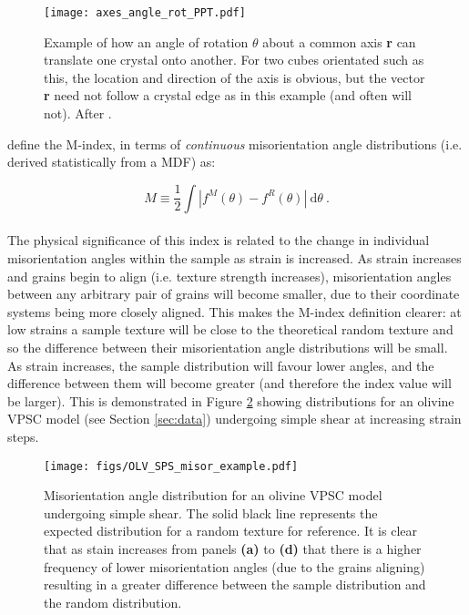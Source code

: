 \documentclass[a4paper,12pt,twoside]{report}
\numberwithin{equation}{chapter}
\begin{document}
\begin{figure}[h]
  \centering
    \texttt{[image: axes\_angle\_rot\_PPT.pdf]}
  \caption[Angle/axis of rotation example]{Example of how an angle of rotation $\theta$ about a common axis \textbf{r} can translate one crystal onto another. For two cubes orientated such as this, the location and direction of the axis is obvious, but the vector \textbf{r} need not follow a crystal edge as in this example (and often will not). After \cite{Randle2000}.}
  \label{fig:angle-axis_example}
\end{figure}

\cite{Skemer} define the M-index, in terms of \emph{continuous} misorientation angle distributions (i.e. derived statistically from a MDF) as:

\begin{equation} \label{eq:Mindex_cont}
M \equiv \frac{1}{2} \int | f^M(\theta) - f^R(\theta) |\ \mathrm{d}\theta \ .
\end{equation}  
\\   
The physical significance of this index is related to the change in individual misorientation angles within the sample as strain is increased. As strain increases and grains begin to align (i.e. texture strength increases), misorientation angles between any arbitrary pair of grains will become smaller, due to their coordinate systems being more closely aligned. This makes the M-index definition clearer: at low strains a sample texture will be close to the theoretical random texture and so the difference between their misorientation angle distributions will be small. As strain increases, the sample distribution will favour lower angles, and the difference between them will become greater (and therefore the index value will be larger). This is demonstrated in Figure \ref{fig:misorientation_example} showing distributions for an olivine VPSC model (see Section \ref{sec:data}) undergoing simple shear at increasing strain steps.


\begin{figure}[t]
  \centering
    \texttt{[image: figs/OLV\_SPS\_misor\_example.pdf]}
  \caption[Misorientation angle distribution example (olivine VPSC)]{Misorientation angle distribution for an olivine VPSC model undergoing simple shear. The solid black line represents the expected distribution for a random texture for reference. It is clear that as stain increases from panels \textbf{(a)} to \textbf{(d)} that there is a higher frequency of lower misorientation angles (due to the grains aligning) resulting in a greater difference between the sample distribution and the random distribution.}
  \label{fig:misorientation_example}
\end{figure}
\end{document}
